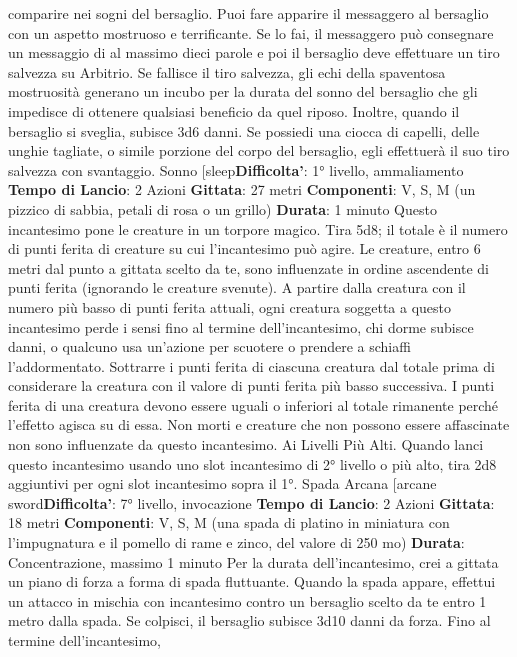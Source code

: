 \begin{multicols}{2}
comparire nei sogni del bersaglio.
Puoi fare apparire il messaggero al bersaglio con un
aspetto mostruoso e terrificante. Se lo fai, il
messaggero può consegnare un messaggio di al
massimo dieci parole e poi il bersaglio deve effettuare
un tiro salvezza su Arbitrio. Se fallisce il tiro
salvezza, gli echi della spaventosa mostruosità
generano un incubo per la durata del sonno del
bersaglio che gli impedisce di ottenere qualsiasi
beneficio da quel riposo. Inoltre, quando il bersaglio si
sveglia, subisce 3d6 danni.
Se possiedi una ciocca di capelli, delle unghie tagliate,
o simile porzione del corpo del bersaglio, egli effettuerà
il suo tiro salvezza con svantaggio.
Sonno
[sleep\textbf{Difficolta'}:
1° livello, ammaliamento
\textbf{Tempo di Lancio}: 2 Azioni
\textbf{Gittata}: 27 metri
\textbf{Componenti}: V, S, M (un pizzico di sabbia, petali di
rosa o un grillo)
\textbf{Durata}: 1 minuto
Questo incantesimo pone le creature in un torpore
magico. Tira 5d8; il totale è il numero di punti ferita di
creature su cui l’incantesimo può agire. Le creature,
entro 6 metri dal punto a gittata scelto da te, sono
influenzate in ordine ascendente di punti ferita
(ignorando le creature svenute).
A partire dalla creatura con il numero più basso di punti
ferita attuali, ogni creatura soggetta a questo
incantesimo perde i sensi fino al termine
dell’incantesimo, chi dorme subisce danni, o qualcuno
usa un’azione per scuotere o prendere a schiaffi
l’addormentato. Sottrarre i punti ferita di ciascuna
creatura dal totale prima di considerare la creatura con
il valore di punti ferita più basso successiva. I punti
ferita di una creatura devono essere uguali o inferiori al
totale rimanente perché l’effetto agisca su di essa.
Non morti e creature che non possono essere
affascinate non sono influenzate da questo
incantesimo.
Ai Livelli Più Alti. Quando lanci questo incantesimo
usando uno slot incantesimo di 2° livello o più alto, tira
2d8 aggiuntivi per ogni slot incantesimo sopra il 1°.
Spada Arcana
[arcane sword\textbf{Difficolta'}:
7° livello, invocazione
\textbf{Tempo di Lancio}: 2 Azioni
\textbf{Gittata}: 18 metri
\textbf{Componenti}: V, S, M (una spada di platino in miniatura
con l’impugnatura e il pomello di rame e zinco, del
valore di 250 mo)
\textbf{Durata}: Concentrazione, massimo 1 minuto
Per la durata dell’incantesimo, crei a gittata un piano di
forza a forma di spada fluttuante.
Quando la spada appare, effettui un attacco in mischia
con incantesimo contro un bersaglio scelto da te entro
1 metro dalla spada. Se colpisci, il bersaglio subisce
3d10 danni da forza. Fino al termine dell’incantesimo,

\end{multicols}
